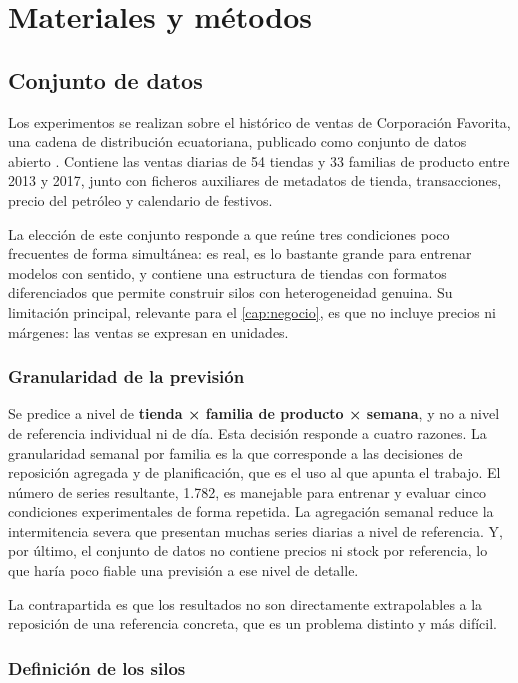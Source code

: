 \chapter{Materiales y métodos}
\label{cap:materiales}

\section{Conjunto de datos}

Los experimentos se realizan sobre el histórico de ventas de Corporación Favorita, una cadena de
distribución ecuatoriana, publicado como conjunto de datos abierto \parencite{kaggle_storesales}.
Contiene las ventas diarias de 54 tiendas y 33 familias de producto entre 2013 y 2017, junto con
ficheros auxiliares de metadatos de tienda, transacciones, precio del petróleo y calendario de
festivos.

La elección de este conjunto responde a que reúne tres condiciones poco frecuentes de forma
simultánea: es real, es lo bastante grande para entrenar modelos con sentido, y contiene una
estructura de tiendas con formatos diferenciados que permite construir silos con heterogeneidad
genuina. Su limitación principal, relevante para el \cref{cap:negocio}, es que no incluye precios
ni márgenes: las ventas se expresan en unidades.

\subsection{Granularidad de la previsión}

Se predice a nivel de \textbf{tienda × familia de producto × semana}, y no a nivel de referencia
individual ni de día. Esta decisión responde a cuatro razones. La granularidad semanal por familia
es la que corresponde a las decisiones de reposición agregada y de planificación, que es el uso al
que apunta el trabajo. El número de series resultante, 1.782, es manejable para entrenar y evaluar
cinco condiciones experimentales de forma repetida. La agregación semanal reduce la intermitencia
severa que presentan muchas series diarias a nivel de referencia. Y, por último, el conjunto de
datos no contiene precios ni stock por referencia, lo que haría poco fiable una previsión a ese
nivel de detalle.

La contrapartida es que los resultados no son directamente extrapolables a la reposición de una
referencia concreta, que es un problema distinto y más difícil.

\subsection{Definición de los silos}


